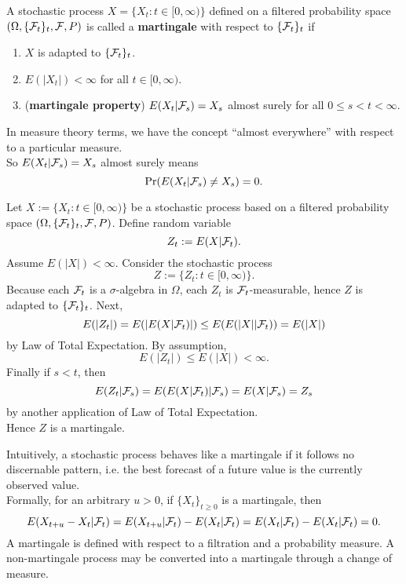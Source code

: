 \documentclass[11pt,fleqn]{book} %
\begin{document}
\begin{definition} \label{def:314}
A stochastic process \(X = \{X_t: t \in [0, \infty)\}\) defined on a filtered probability space \((\Omega, \{\mathcal{F}_t\}_t, \mathcal{F}, P)\) is called a \textbf{martingale} with respect to \(\{\mathcal{F}_t\}_t\) if
\begin{enumerate}
\item \(X\) is adapted to \(\{\mathcal{F}_t\}_t\).
\item \(E(|X_t|) < \infty\) for all \(t \in [0, \infty)\). 
\item (\textbf{martingale property}) \(E(X_t | \mathcal{F}_s) = X_s\) almost surely for all \(0 \leq s < t < \infty\).
\end{enumerate}
\end{definition}

\begin{remark} \label{rmk:315}
In measure theory terms, we have the concept ``almost everywhere'' with respect to a particular measure. \\
\indent So \(E(X_t|\mathcal{F}_s) = X_s\) almost surely means
\[
\Pr(E(X_t|\mathcal{F}_s) \neq X_s) = 0.
\]
\end{remark}

\begin{example} \label{eg:316}
Let \(X := \{X_t: t \in [0, \infty)\}\) be a stochastic process based on a filtered probability space \((\Omega, \{\mathcal{F}_t\}_t, \mathcal{F}, P)\). Define random variable
\[
Z_t := E(X | \mathcal{F}_t).
\]
\indent Assume \(E(|X|) < \infty\). Consider the stochastic process
\[
Z := \{Z_t: t \in [0, \infty)\}.
\]
\indent Because each \(\mathcal{F}_t\) is a \(\sigma\)-algebra in \(\Omega\), each \(Z_t\) is \(\mathcal{F}_t\)-measurable, hence \(Z\) is adapted to \(\{\mathcal{F}_t\}_t\). Next,
\[
E(|Z_t|) = E(|E(X | \mathcal{F}_t)|) \leq E(E(|X| | \mathcal{F}_t)) = E(|X|)
\]
by Law of Total Expectation. By assumption,
\[
E(|Z_t|) \leq E(|X|) < \infty.
\]
\indent Finally if \(s < t\), then
\[
E(Z_t|\mathcal{F}_s) = E(E(X|\mathcal{F}_t)|\mathcal{F}_s) = E(X|\mathcal{F}_s) = Z_s
\]
by another application of Law of Total Expectation. \\
\indent Hence \(Z\) is a martingale.
\end{example}

\begin{remark} \label{rmk:317}
Intuitively, a stochastic process behaves like a martingale if it follows no discernable pattern, i.e. the best forecast of a future value is the currently observed value. \\
\indent Formally, for an arbitrary \(u > 0\), if \(\{X_t\}_{t \geq 0}\) is a martingale, then
\[
E(X_{t + u} - X_t | \mathcal{F}_t) = E(X_{t + u}|\mathcal{F}_t) - E(X_t|\mathcal{F}_t) = E(X_t|\mathcal{F}_t) - E(X_t|\mathcal{F}_t) = 0.
\]
\indent A martingale is defined with respect to a filtration and a probability measure. A non-martingale process may be converted into a martingale through a change of measure.
\end{remark}
\end{document}
